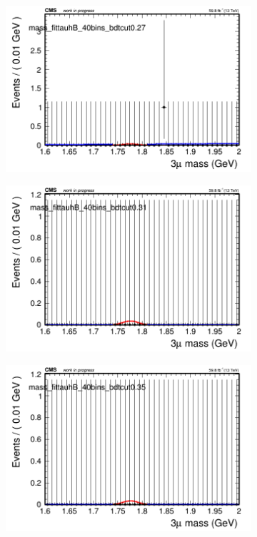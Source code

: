 \begin{figure}[H]
\begin{subfigure}{0.2\textwidth}
        \includegraphics[width=\textwidth]{unfixed_exp/plots/tauhB/massfit_tauhB_40bins_bdtcut0.27.png}
        \caption{}
    \end{subfigure}
    \begin{subfigure}{0.2\textwidth}
        \includegraphics[width=\textwidth]{unfixed_exp/plots/tauhB/massfit_tauhB_40bins_bdtcut0.31.png}
        \caption{}
    \end{subfigure}
    \begin{subfigure}{0.2\textwidth}
        \includegraphics[width=\textwidth]{unfixed_exp/plots/tauhB/massfit_tauhB_40bins_bdtcut0.35.png}

\end{subfigure}
\end{figure}
